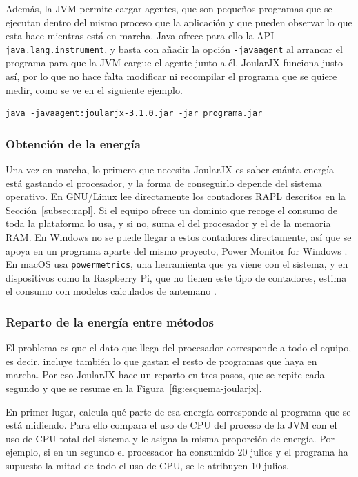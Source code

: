 Además, la JVM permite cargar agentes, que son pequeños programas que se
ejecutan dentro del mismo proceso que la aplicación y que pueden observar lo
que esta hace mientras está en marcha. Java ofrece para ello la API
\texttt{java.lang.instrument}, y basta con añadir la opción
\texttt{-javaagent} al arrancar el programa para que la JVM cargue el agente
junto a él. JoularJX funciona justo así, por lo que no hace falta modificar ni
recompilar el programa que se quiere medir, como se ve en el siguiente ejemplo.

\begin{verbatim}
java -javaagent:joularjx-3.1.0.jar -jar programa.jar
\end{verbatim}

\subsubsection{Obtención de la energía}
\label{subsubsec:obtencion-energia}

Una vez en marcha, lo primero que necesita JoularJX es saber cuánta energía
está gastando el procesador, y la forma de conseguirlo depende del sistema
operativo. En GNU/Linux lee directamente los contadores RAPL descritos en la
Sección~\ref{subsec:rapl}. Si el equipo ofrece un dominio que recoge el consumo
de toda la plataforma lo usa, y si no, suma el del procesador y el de la
memoria RAM. En Windows no se puede llegar a estos contadores directamente, así
que se apoya en un programa aparte del mismo proyecto, Power Monitor for
Windows \cite{winpowermonitor}. En macOS usa \texttt{powermetrics}, una
herramienta que ya viene con el sistema, y en dispositivos como la Raspberry
Pi, que no tienen este tipo de contadores, estima el consumo con modelos
calculados de antemano \cite{joularjx2022, joularjxrepo}.

\subsubsection{Reparto de la energía entre métodos}
\label{subsubsec:reparto-energia}

El problema es que el dato que llega del procesador corresponde a todo el
equipo, es decir, incluye también lo que gastan el resto de programas que haya
en marcha. Por eso JoularJX hace un reparto en tres pasos, que se repite cada
segundo y que se resume en la Figura~\ref{fig:esquema-joularjx}.

En primer lugar, calcula qué parte de esa energía corresponde al programa que
se está midiendo. Para ello compara el uso de CPU del proceso de la JVM con el
uso de CPU total del sistema y le asigna la misma proporción de energía. Por
ejemplo, si en un segundo el procesador ha consumido 20 julios y el programa ha
supuesto la mitad de todo el uso de CPU, se le atribuyen 10 julios.

